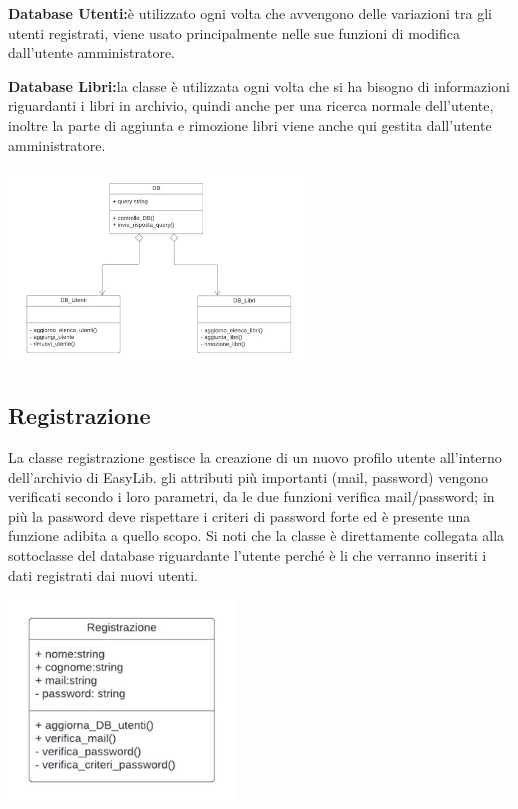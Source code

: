 \documentclass{article}
\begin{document}
\textbf{Database Utenti:}è utilizzato ogni volta che avvengono delle variazioni tra gli utenti registrati, viene usato principalmente nelle sue funzioni di modifica dall’utente amministratore.

\textbf{Database Libri:}la classe è utilizzata ogni volta che si ha bisogno di informazioni riguardanti i libri in archivio, quindi anche per una ricerca normale dell’utente, inoltre la parte di aggiunta e rimozione libri viene anche qui gestita dall’utente amministratore.
\begin{center}
        \includegraphics[width=80mm]{D3/Images/Databases.jpg}
\end{center}

\subsection{Registrazione} 
La classe registrazione gestisce la creazione di un nuovo profilo utente all’interno dell'archivio di EasyLib. gli attributi più importanti (mail, password) vengono verificati secondo i loro parametri, da le due funzioni verifica mail/password; in più la password deve rispettare i criteri di password forte ed è presente una funzione adibita a quello scopo. Si noti che la classe è direttamente collegata alla sottoclasse del database riguardante l’utente perché è li che verranno inseriti i dati registrati dai nuovi utenti.
\begin{center}
        \includegraphics[width=60mm]{D3/Images/Registrazione.jpg}
\end{center}
\end{document}
